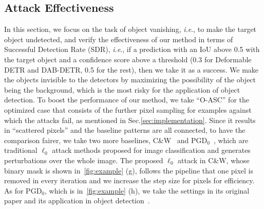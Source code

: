 \documentclass[times,twocolumn,final,authoryear]{elsarticle}
\def\onedot{.\null\xspace}
\def\ie{\emph{i.e}\onedot} \def\Ie{\emph{I.e}\onedot}
\begin{document}
\subsection{Attack Effectiveness}

In this section, we focus on the task of object vanishing, \ie, to make the target object undetected, and verify the effectiveness of our method in terms of Successful Detection Rate (SDR), \ie, if a prediction with an IoU above 0.5 with the target object and a confidence score above a threshold (0.3 for Deformable DETR and DAB-DETR, 0.5 for the rest), then we take it as a success. We make the objects invisible to the detectors by maximizing the possibility of the object being the background, which is the most risky for the application of object detection. To boost the performance of our method, we take ``O-ASC'' for the optimized case that consists of the further pixel sampling for examples against which the attacks fail, as mentioned in Sec.\ref{sec:implementation}. Since it results in ``scattered pixels'' and the baseline patterns are all connected, to have the comparison fairer, we take two more baselines, C\&W~\citep{carlini2017towards} and PGD$_0$~\citep{croce2019sparse}, which are traditional $\ell_0$ attack methods proposed for image classification and generates perturbations over the whole image. The proposed $\ell_0$ attack in C\&W, whose binary mask is shown in~\cref{fig:example} (g), follows the pipeline that one pixel is removed in every iteration and we increase the step size for pixels for efficiency. As for PGD$_0$, which is in~\cref{fig:example} (h), we take the settings in its original paper and its application in object detection~\citep{li2020fool}.
\end{document}
